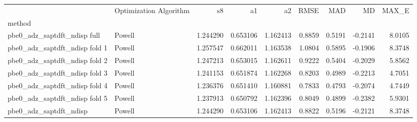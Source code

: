 \begin{tabular}{llrrrrrrr}
 & Optimization Algorithm & s8 & a1 & a2 & RMSE & MAD & MD & MAX_E \\
method &  &  &  &  &  &  &  &  \\
pbe0_adz_saptdft_ndisp full & Powell & 1.244290 & 0.653106 & 1.162413 & 0.8859 & 0.5191 & -0.2141 & 8.0105 \\
pbe0_adz_saptdft_ndisp fold 1 & Powell & 1.257547 & 0.662011 & 1.163538 & 1.0804 & 0.5895 & -0.1906 & 8.3748 \\
pbe0_adz_saptdft_ndisp fold 2 & Powell & 1.247213 & 0.653015 & 1.162611 & 0.9222 & 0.5404 & -0.2029 & 5.8562 \\
pbe0_adz_saptdft_ndisp fold 3 & Powell & 1.241153 & 0.651874 & 1.162268 & 0.8203 & 0.4989 & -0.2213 & 4.7051 \\
pbe0_adz_saptdft_ndisp fold 4 & Powell & 1.236376 & 0.651410 & 1.160881 & 0.7833 & 0.4793 & -0.2074 & 4.7449 \\
pbe0_adz_saptdft_ndisp fold 5 & Powell & 1.237913 & 0.650792 & 1.162396 & 0.8049 & 0.4899 & -0.2382 & 5.9301 \\
pbe0_adz_saptdft_ndisp & Powell & 1.244290 & 0.653106 & 1.162413 & 0.8822 & 0.5196 & -0.2121 & 8.3748 \\
\end{tabular}
